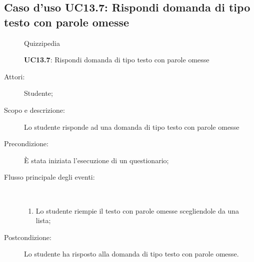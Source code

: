 \subsection{Caso d'uso UC13.7: Rispondi domanda di tipo testo con parole omesse}
	\begin{figure}[H]
		\centering
		\begin{resizedtikzpicture}{\textwidth}
		\begin{umlsystem}[x=0, fill=lightgray!20]{Quizzipedia}
		\end{umlsystem}
		\end{resizedtikzpicture}
		\caption{\textbf{UC13.7}: Rispondi domanda di tipo testo con parole omesse}
		\label{UC13.7}
	\end{figure}
\begin{description}
\item[Attori:] Studente;
\item[Scopo e descrizione:] Lo studente risponde ad una domanda di tipo testo con parole omesse
      \item[Precondizione:] È stata iniziata l'esecuzione di un questionario;

        \item[Flusso principale degli eventi:] \ 
 \begin{enumerate}
          \item Lo studente riempie il testo con parole omesse scegliendole da una lista;

      \end{enumerate}
    \item[Postcondizione:] Lo studente ha risposto alla domanda di tipo testo con parole omesse.
  \end{description}
\hypertarget{UC13.8}{}
